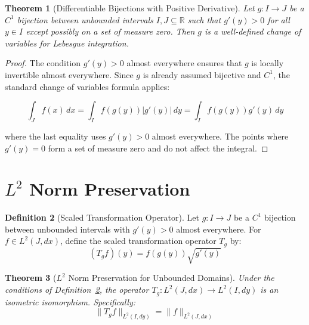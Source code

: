 \documentclass[11pt]{article}
\theoremstyle{theorem}
\newtheorem{theorem}{Theorem}[section]
\theoremstyle{definition}
\newtheorem{definition}[theorem]{Definition}
\begin{document}
\begin{theorem}[Differentiable Bijections with Positive Derivative]
\label{thm:diff_bijective}
Let $g: I \to J$ be a $C^1$ bijection between unbounded intervals $I, J \subseteq \mathbb{R}$ such that $g'(y) > 0$ for all $y \in I$ except possibly on a set of measure zero. Then $g$ is a well-defined change of variables for Lebesgue integration.
\end{theorem}

\begin{proof}
The condition $g'(y) > 0$ almost everywhere ensures that $g$ is locally invertible almost everywhere. Since $g$ is already assumed bijective and $C^1$, the standard change of variables formula applies:

\begin{equation}
\label{eq:change_vars}
\int_J f(x) \, dx = \int_I f(g(y)) |g'(y)| \, dy = \int_I f(g(y)) g'(y) \, dy
\end{equation}

where the last equality uses $g'(y) > 0$ almost everywhere. The points where $g'(y) = 0$ form a set of measure zero and do not affect the integral.
\end{proof}

\section{$L^2$ Norm Preservation}

\begin{definition}[Scaled Transformation Operator]
\label{def:scaled_transform}
Let $g: I \to J$ be a $C^1$ bijection between unbounded intervals with $g'(y) > 0$ almost everywhere. For $f \in L^2(J, dx)$, define the scaled transformation operator $T_g$ by:
\begin{equation}
\label{eq:scaled_transform}
(T_g f)(y) = f(g(y)) \sqrt{g'(y)}
\end{equation}
\end{definition}

\begin{theorem}[$L^2$ Norm Preservation for Unbounded Domains]
\label{thm:l2_preservation}
Under the conditions of Definition~\ref{def:scaled_transform}, the operator $T_g: L^2(J, dx) \to L^2(I, dy)$ is an isometric isomorphism. Specifically:
\begin{equation}
\label{eq:norm_equality}
\|T_g f\|_{L^2(I, dy)} = \|f\|_{L^2(J, dx)}
\end{equation}
\end{theorem}
\end{document}
